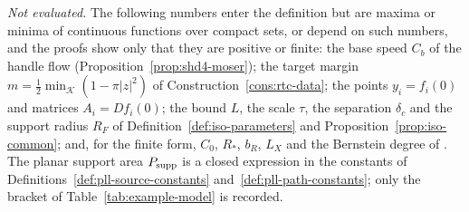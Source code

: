 \emph{Not evaluated.} The following numbers enter the definition but are maxima or minima of continuous functions over
compact sets, or depend on such numbers, and the proofs show only that they are positive or finite: the base speed $C_b$
of the handle flow (Proposition~\ref{prop:shd4-moser}); the target margin $m=\frac12\min_{\mathcal K}(1-\pi|z|^2)$ of
Construction~\ref{cons:rtc-data}; the points $y_i=f_i(0)$ and matrices $A_i=Df_i(0)$; the bound $L$, the scale $\tau$, the
separation $\delta_c$ and the support radius $R_F$ of Definition~\ref{def:iso-parameters} and Proposition~\ref{prop:iso-common};
and, for the finite form, $C_0$, $R_*$, $b_R$, $L_X$ and the Bernstein degree of . The planar support
area $P_{\rm supp}$ is a closed expression in the constants of Definitions~\ref{def:pll-source-constants}
and~\ref{def:pll-path-constants}; only the bracket of Table~\ref{tab:example-model} is recorded.

